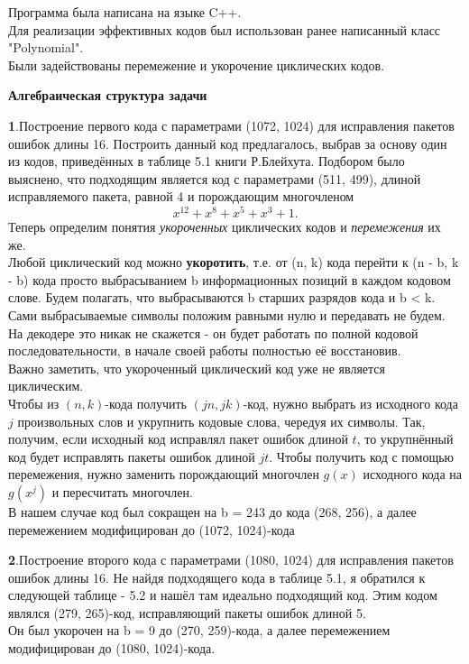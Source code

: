 \documentclass{article}
\begin{document}
   		Программа была написана на языке C++.\\
   		Для реализации эффективных кодов был использован ранее написанный класс "Polynomial".
   		\\
   		Были задействованы перемежение и укорочение циклических кодов.
   		
   		\begin{center}
   			\large \textbf {Алгебраическая структура задачи}
   		\end{center}	 
   		\textbf{1}.Построение первого кода с параметрами (1072, 1024) для исправления пакетов ошибок длины 16.
   		Построить данный код предлагалось, выбрав за основу один из кодов, приведённых в таблице 5.1 книги Р.Блейхута. Подбором было выяснено, что подходящим является код с параметрами (511, 499), длиной исправляемого пакета, равной 4 и порождающим многочленом $$x^{12} + x^{8} + x^5 + x^3 + 1.$$
   		Теперь определим понятия \textit{укороченных} циклических кодов и \textit{перемежения} их же.\\
   		
   		Любой циклический код можно \textbf{укоротить}, т.е. от (n, k) кода перейти к (n - b, k - b) кода просто выбрасыванием b информационных позиций в каждом кодовом слове. Будем полагать, что выбрасываются b старших разрядов кода и b < k.
   		Сами выбрасываемые символы положим равными нулю и передавать не будем. На декодере это никак не скажется - он будет работать по полной кодовой последовательности, в начале своей работы полностью её восстановив.\\
   		
   		Важно заметить, что укороченный циклический код уже не является циклическим. \\
   		
   		Чтобы из $(n, k)$-кода получить $(jn, jk)$-код, нужно выбрать из исходного кода $j$ произвольных слов и укрупнить кодовые слова, чередуя их символы. Так, получим, если исходный код исправлял пакет ошибок длиной $t$, то укрупнённый код будет исправлять пакеты ошибок длиной $jt$.
   		Чтобы получить код с помощью перемежения, нужно заменить порождающий многочлен $g(x)$ исходного кода на $g(x^j)$ и пересчитать многочлен.\\
   		
   		В нашем случае код был сокращен на b = 243 до кода (268, 256), а далее перемежением модифицирован до (1072, 1024)-кода
   		
   		
   		\textbf{2}.Построение второго кода с параметрами (1080, 1024) для исправления пакетов ошибок длины 16. 
   		Не найдя подходящего кода в таблице 5.1, я обратился к следующей таблице - 5.2 и нашёл там идеально подходящий код.
   		Этим кодом являлся (279, 265)-код, исправляющий пакеты ошибок длиной 5.\\
   		Он был укорочен на b = 9 до (270, 259)-кода, а далее перемежением модифицирован до (1080, 1024)-кода.
   		
\end{document}
